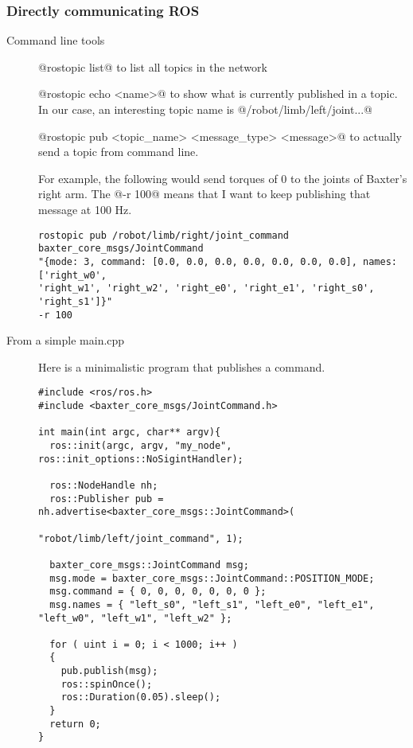 \documentclass[10pt,fleqn,twoside]{article}
\newenvironment{code}{\footnotesize}{}
\begin{document}
\subsubsection{Directly communicating ROS}

\begin{description}
\item[Command line tools]

@rostopic list@ to list all topics in the network

@rostopic echo <name>@ to show what is currently published in a
topic. In our case, an interesting topic name is @/robot/limb/left/joint...@

@rostopic pub <topic_name> <message_type> <message>@ to actually send a 
topic from command line.

For example, the following would send torques of 0 to the joints of Baxter's
right arm. The @-r 100@ means that I want to keep publishing that message at
 100 Hz.

\begin{code}
\begin{Verbatim}
rostopic pub /robot/limb/right/joint_command baxter_core_msgs/JointCommand
"{mode: 3, command: [0.0, 0.0, 0.0, 0.0, 0.0, 0.0, 0.0], names: ['right_w0',
'right_w1', 'right_w2', 'right_e0', 'right_e1', 'right_s0', 'right_s1']}" 
-r 100
\end{Verbatim}
\end{code}

\item[From a simple main.cpp] Here is a minimalistic program that publishes a
  command.
\begin{code}
\begin{Verbatim}
#include <ros/ros.h>
#include <baxter_core_msgs/JointCommand.h>

int main(int argc, char** argv){
  ros::init(argc, argv, "my_node", ros::init_options::NoSigintHandler);

  ros::NodeHandle nh;
  ros::Publisher pub = nh.advertise<baxter_core_msgs::JointCommand>(
                                       "robot/limb/left/joint_command", 1);

  baxter_core_msgs::JointCommand msg;
  msg.mode = baxter_core_msgs::JointCommand::POSITION_MODE;
  msg.command = { 0, 0, 0, 0, 0, 0, 0 };
  msg.names = { "left_s0", "left_s1", "left_e0", "left_e1", "left_w0", "left_w1", "left_w2" };

  for ( uint i = 0; i < 1000; i++ )
  {
    pub.publish(msg);
    ros::spinOnce();
    ros::Duration(0.05).sleep();
  }
  return 0;
}


\end{Verbatim}
\end{code}
\end{description}
\end{document}
